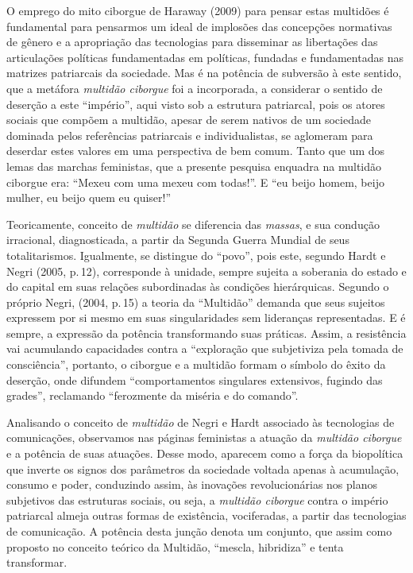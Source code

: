 O emprego do mito ciborgue de Haraway (2009) para pensar estas multidões
é fundamental para pensarmos um ideal de implosões das concepções
normativas de gênero e a apropriação das tecnologias para disseminar as
libertações das articulações políticas fundamentadas em políticas,
fundadas e fundamentadas nas matrizes patriarcais da sociedade. Mas é na
potência de subversão à este sentido, que a metáfora \textit{multidão
ciborgue} foi a incorporada, a considerar o sentido de deserção a este
``império'', aqui visto sob a estrutura patriarcal, pois os atores
sociais que compõem a multidão, apesar de serem nativos de um sociedade
dominada pelos referências patriarcais e individualistas, se aglomeram
para deserdar estes valores em uma perspectiva de bem comum. Tanto que
um dos lemas das marchas feministas, que a presente pesquisa enquadra na
multidão ciborgue era: ``Mexeu com uma mexeu com todas!''. E ``eu beijo
homem, beijo mulher, eu beijo quem eu quiser!''

Teoricamente, conceito de \textit{multidão} se diferencia das \textit{massas}, e
sua condução irracional, diagnosticada, a partir da Segunda Guerra
Mundial de seus totalitarismos. Igualmente, se distingue do ``povo'',
pois este, segundo Hardt e Negri (2005, p.\,12), corresponde à unidade,
sempre sujeita a soberania do estado e do capital em suas relações
subordinadas às condições hierárquicas. Segundo o próprio Negri, (2004,
p.\,15) a teoria da ``Multidão'' demanda que seus sujeitos expressem por
si mesmo em suas singularidades sem lideranças representadas. E é
sempre, a expressão da potência transformando suas práticas. Assim, a
resistência vai acumulando capacidades contra a ``exploração que
subjetiviza pela tomada de consciência'', portanto, o ciborgue e a
multidão formam o símbolo do êxito da deserção, onde difundem
``comportamentos singulares extensivos, fugindo das grades'', reclamando
``ferozmente da miséria e do comando''.

Analisando o conceito de \textit{multidão} de Negri e Hardt associado às
tecnologias de comunicações, observamos nas páginas feministas a atuação
da \textit{multidão ciborgue} e a potência de suas atuações. Desse modo, aparecem
como a força da biopolítica que inverte os signos dos parâmetros da
sociedade voltada apenas à acumulação, consumo e poder, conduzindo
assim, às inovações revolucionárias nos planos subjetivos das estruturas
sociais, ou seja, a \textit{multidão ciborgue} contra o império patriarcal almeja
outras formas de existência, vociferadas, a partir das tecnologias de
comunicação. A potência desta junção denota um conjunto, que assim como
proposto no conceito teórico da Multidão, ``mescla, hibridiza'' e tenta
transformar.

